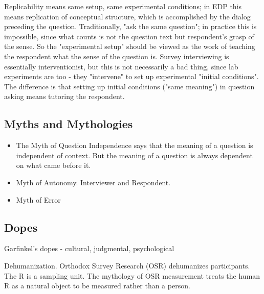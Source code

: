 \documentclass[11pt,twoside]{article}
\begin{document}
Replicability means same setup, same experimental conditions; in EDP
this means replication of conceptual structure, which is accomplished
by the dialog preceding the question.  Traditionally, "ask the same
question"; in practice this is impossible, since what counts is not
the question text but respondent's grasp of the sense.  So the
"experimental setup" should be viewed as the work of teaching the
respondent what the sense of the question is.  Survey interviewing is
essentially interventionist, but this is not necessarily a bad thing,
since lab experiments are too - they "intervene" to set up
experimental "initial conditions".  The difference is that setting up
initial conditions ("same meaning") in question asking means tutoring
the respondent.

\subsection{Myths and Mythologies}

\begin{itemize}
\item The Myth of Question Independence says that the meaning of a
    question is independent of context.  But the meaning of a question
    is always dependent on what came before it.
\item Myth of Autonomy. Interviewer and Respondent.
\item Myth of Error
\end{itemize}

\subsection{Dopes}

Garfinkel's dopes - cultural, judgmental, psychological

Dehumanization.  Orthodox Survey Research (OSR) dehumanizes
participants.  The R is a sampling unit.  The mythology of OSR
measurement treats the human R as a natural object to be measured
rather than a person.
\end{document}
